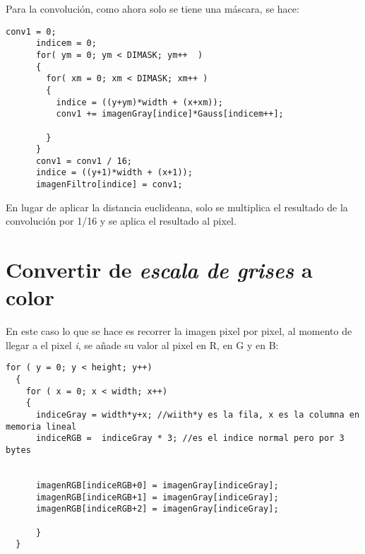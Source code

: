 \documentclass[11pt,a4paper]{article}
\begin{document}
Para la convolución, como ahora solo se tiene una máscara, se hace:
\lstset{language=C, breaklines=true, basicstyle=\footnotesize}
\lstset{numbers=left, numberstyle=\tiny, stepnumber=1, numbersep=-2pt}
\begin{lstlisting}[frame=single]
conv1 = 0;
      indicem = 0;
      for( ym = 0; ym < DIMASK; ym++  )
      {
        for( xm = 0; xm < DIMASK; xm++ )
        {
          indice = ((y+ym)*width + (x+xm));
          conv1 += imagenGray[indice]*Gauss[indicem++];
          
        }
      }
      conv1 = conv1 / 16;
      indice = ((y+1)*width + (x+1));
      imagenFiltro[indice] = conv1;
\end{lstlisting}

En lugar de aplicar la distancia euclideana, solo se multiplica el resultado de la convolución por 1/16 y se aplica el resultado al pixel.

\section{Convertir de \textit{escala de grises} a color}

En este caso lo que se hace es recorrer la imagen pixel por pixel, al momento de llegar a el pixel \textit{i}, se añade su valor al pixel en R, en G y en B:

\lstset{language=C, breaklines=true, basicstyle=\footnotesize}
\lstset{numbers=left, numberstyle=\tiny, stepnumber=1, numbersep=-2pt}
\begin{lstlisting}[frame=single]
for ( y = 0; y < height; y++)
  {
    for ( x = 0; x < width; x++)
    {
      indiceGray = width*y+x; //wiith*y es la fila, x es la columna en memoria lineal
      indiceRGB =  indiceGray * 3; //es el indice normal pero por 3 bytes
  

      imagenRGB[indiceRGB+0] = imagenGray[indiceGray];
      imagenRGB[indiceRGB+1] = imagenGray[indiceGray];
      imagenRGB[indiceRGB+2] = imagenGray[indiceGray];

      }
  }
\end{lstlisting}
\end{document}
